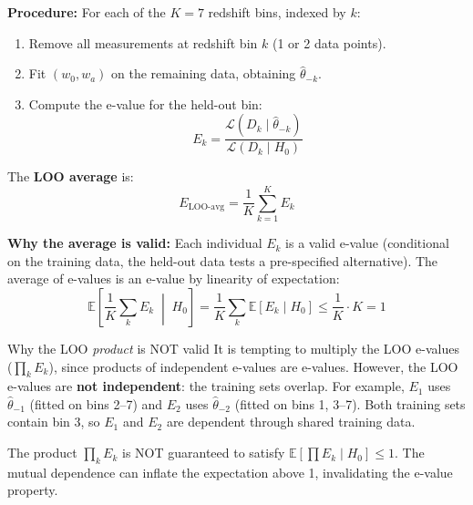 \documentclass[11pt,a4paper]{article}
\newcommand{\E}{\mathbb{E}}
\begin{document}
\textbf{Procedure:} For each of the $K = 7$ redshift bins, indexed by $k$:
\begin{enumerate}
    \item Remove all measurements at redshift bin $k$ (1 or 2 data points).
    \item Fit $(w_0, w_a)$ on the remaining data, obtaining $\hat{\theta}_{-k}$.
    \item Compute the e-value for the held-out bin:
    \begin{equation}
    E_k = \frac{\mathcal{L}(D_k \mid \hat{\theta}_{-k})}{\mathcal{L}(D_k \mid H_0)}
    \end{equation}
\end{enumerate}

The \textbf{LOO average} is:
\begin{equation}
\boxed{E_{\text{LOO-avg}} = \frac{1}{K} \sum_{k=1}^K E_k}
\end{equation}

\textbf{Why the average is valid:} Each individual $E_k$ is a valid e-value (conditional on the training data, the held-out data tests a pre-specified alternative). The average of e-values is an e-value by linearity of expectation:
\begin{equation}
\E\!\left[\frac{1}{K}\sum_k E_k \;\middle|\; H_0\right] = \frac{1}{K}\sum_k \E[E_k \mid H_0] \leq \frac{1}{K} \cdot K = 1
\end{equation}

\begin{warningbox}{Why the LOO \textit{product} is NOT valid}
It is tempting to multiply the LOO e-values ($\prod_k E_k$), since products of independent e-values are e-values. However, the LOO e-values are \textbf{not independent}: the training sets overlap. For example, $E_1$ uses $\hat{\theta}_{-1}$ (fitted on bins 2--7) and $E_2$ uses $\hat{\theta}_{-2}$ (fitted on bins 1, 3--7). Both training sets contain bin 3, so $E_1$ and $E_2$ are dependent through shared training data.

The product $\prod_k E_k$ is NOT guaranteed to satisfy $\E[\prod E_k \mid H_0] \leq 1$. The mutual dependence can inflate the expectation above 1, invalidating the e-value property.
\end{warningbox}
\end{document}
